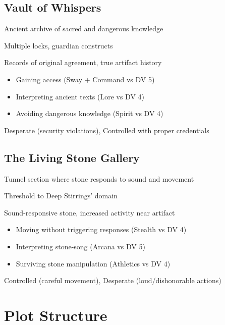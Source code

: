 \documentclass[11pt]{article}
\newenvironment{location}[1]{\begin{description}[leftmargin=*,style=standard]\item[\textbf{#1}]}{\end{description}}
\begin{document}
\subsection{Vault of Whispers}
\begin{location}{Vault of Whispers}
\item[Description:] Ancient archive of sacred and dangerous knowledge
\item[Security:] Multiple locks, guardian constructs
\item[Features:] Records of original agreement, true artifact history
\item[Challenges:] 
  \begin{itemize}
    \item Gaining access (Sway + Command vs DV 5)
    \item Interpreting ancient texts (Lore vs DV 4)
    \item Avoiding dangerous knowledge (Spirit vs DV 4)
  \end{itemize}
\item[Position:] Desperate (security violations), Controlled with proper credentials
\end{location}

\subsection{The Living Stone Gallery}
\begin{location}{The Living Stone Gallery}
\item[Description:] Tunnel section where stone responds to sound and movement
\item[Connection:] Threshold to Deep Stirrings' domain
\item[Features:] Sound-responsive stone, increased activity near artifact
\item[Challenges:] 
  \begin{itemize}
    \item Moving without triggering responses (Stealth vs DV 4)
    \item Interpreting stone-song (Arcana vs DV 5)
    \item Surviving stone manipulation (Athletics vs DV 4)
  \end{itemize}
\item[Position:] Controlled (careful movement), Desperate (loud/dishonorable actions)
\end{location}

\section{Plot Structure}
\end{document}
